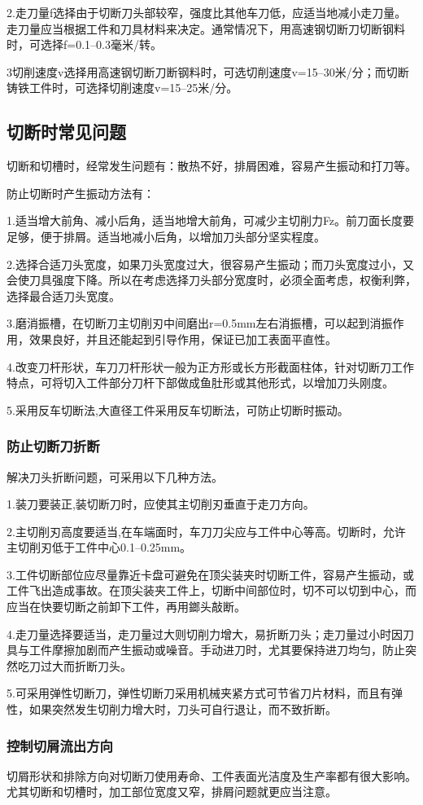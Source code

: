 \documentclass{ctexbook}
\begin{document}
2.走刀量f选择由于切断刀头部较窄，强度比其他车刀低，应适当地减小走刀量。走刀量应当根据工件和刀具材料来决定。通常情况下，用高速钢切断刀切断钢料时，可选择f=0.1--0.3毫米/转。

3切削速度v选择用高速钢切断刀断钢料时，可选切削速度v=15--30米/分；而切断铸铁工件时，可选择切削速度v=15--25米/分。
\subsection{切断时常见问题}
切断和切槽时，经常发生问题有：散热不好，排屑困难，容易产生振动和打刀等。

防止切断时产生振动方法有：

1.适当增大前角、减小后角，适当地增大前角，可减少主切削力Fz。前刀面长度要足够，便于排屑。适当地减小后角，以增加刀头部分坚实程度。

2.选择合适刀头宽度，如果刀头宽度过大，很容易产生振动；而刀头宽度过小，又会使刀具强度下降。所以在考虑选择刀头部分宽度时，必须全面考虑，权衡利弊，选择最合适刀头宽度。

3.磨消振槽，在切断刀主切削刃中间磨出r=0.5mm左右消振槽，可以起到消振作用，效果良好，并且还能起到引导作用，保证已加工表面平直性。

4.改变刀杆形状，车刀刀杆形状一般为正方形或长方形截面柱体，针对切断刀工作特点，可将切入工件部分刀杆下部做成鱼肚形或其他形式，以增加刀头刚度。

5.采用反车切断法,大直径工件采用反车切断法，可防止切断时振动。
\subsubsection{防止切断刀折断}
解决刀头折断问题，可采用以下几种方法。

1.装刀要装正,装切断刀时，应使其主切削刃垂直于走刀方向。

2.主切削刃高度要适当,在车端面时，车刀刀尖应与工件中心等高。切断时，允许主切削刃低于工件中心0.1--0.25mm。

3.工件切断部位应尽量靠近卡盘可避免在顶尖装夹时切断工件，容易产生振动，或工件飞出造成事故。在顶尖装夹工件上，切断中间部位时，切不可以切到中心，而应当在快要切断之前卸下工件，再用鎯头敲断。

4.走刀量选择要适当，走刀量过大则切削力增大，易折断刀头；走刀量过小时因刀具与工件摩擦加剧而产生振动或噪音。手动进刀时，尤其要保持进刀均匀，防止突然吃刀过大而折断刀头。

5.可采用弹性切断刀，弹性切断刀采用机械夹紧方式可节省刀片材料，而且有弹性，如果突然发生切削力增大时，刀头可自行退让，而不致折断。
\subsubsection{控制切屑流出方向}
切屑形状和排除方向对切断刀使用寿命、工件表面光洁度及生产率都有很大影响。尤其切断和切槽时，加工部位宽度又窄，排屑问题就更应当注意。
\end{document}
